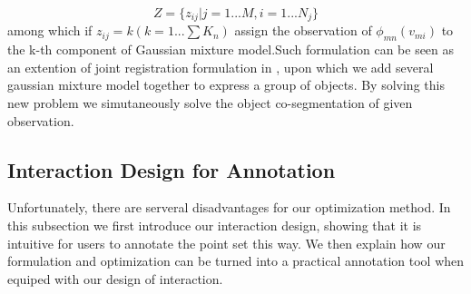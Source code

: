 $$Z=\{z_{ij}|j=1...M,i=1...N_j\}$$
among which if $z_{ij}=k(k=1...\sum{K_n})$ assign the observation of $\phi_{mn}(v_{mi})$ to the k-th component of Gaussian mixture model.Such formulation can be seen as an extention of joint registration formulation in \cite{Evangelidis2014}, upon which we add several gaussian mixture model together to express a group of objects. By solving this new problem we simutaneously solve  the object co-segmentation of given observation.
\subsection{Interaction Design for Annotation}
Unfortunately, there are serveral disadvantages for our optimization method. In this subsection we first introduce our interaction design, showing that it is intuitive for users to annotate the point set this way. We then explain how our formulation and optimization can be turned into a practical annotation tool when equiped with our design of interaction.


